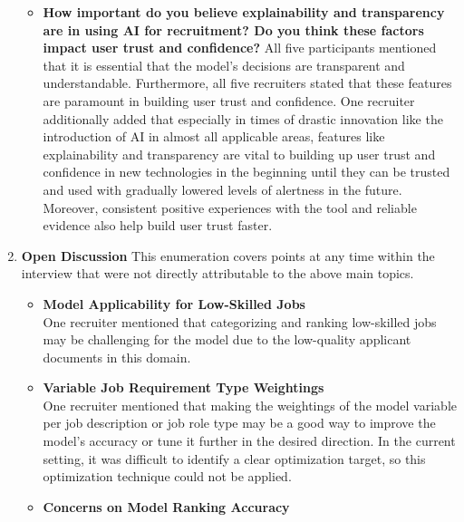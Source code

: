 \documentclass[draft,final]{thesisclass} %
\begin{document}
\begin{enumerate}
\begin{itemize}
        \item \textbf{How important do you believe explainability and transparency are in using \acs{AI} for recruitment? Do you think these factors impact user trust and confidence?}
        All five participants mentioned that it is essential that the model's decisions are transparent and understandable. Furthermore, all five recruiters stated that these features are paramount in building user trust and confidence. One recruiter additionally added that especially in times of drastic innovation like the introduction of \acs{AI} in almost all applicable areas, features like explainability and transparency are vital to building up user trust and confidence in new technologies in the beginning until they can be trusted and used with gradually lowered levels of alertness in the future. Moreover, consistent positive experiences with the tool and reliable evidence also help build user trust faster.
    \end{itemize}
    \item \textbf{Open Discussion}
    This enumeration covers points at any time within the interview that were not directly attributable to the above main topics.
    \begin{itemize}
        \item \textbf{Model Applicability for Low-Skilled Jobs}\\
        One recruiter mentioned that categorizing and ranking low-skilled jobs may be challenging for the model due to the low-quality applicant documents in this domain.
        \item \textbf{Variable Job Requirement Type Weightings}\\
        One recruiter mentioned that making the weightings of the model variable per job description or job role type may be a good way to improve the model's accuracy or tune it further in the desired direction. In the current setting, it was difficult to identify a clear optimization target, so this optimization technique could not be applied.
        \item \textbf{Concerns on Model Ranking Accuracy}\\

\end{itemize}
\end{enumerate}
\end{document}
